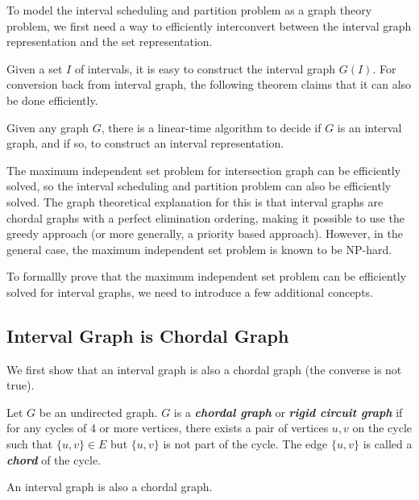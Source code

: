 To model the interval scheduling and partition problem as a graph theory problem, we first need a way to efficiently interconvert between the interval graph representation and the set representation.

Given a set $I$ of intervals, it is easy to construct the interval graph $G(I)$. For conversion back from interval graph, the following theorem claims that it can also be done efficiently.

\begin{theorem}
    Given any graph $G$, there is a linear-time algorithm to decide if $G$ is an interval graph, and if so, to construct an interval representation.
\end{theorem}

The maximum independent set problem for intersection graph can be efficiently solved, so the interval scheduling and partition problem can also be efficiently solved. The graph theoretical explanation for this is that interval graphs are chordal graphs with a perfect elimination ordering, making it possible to use the greedy approach (or more generally, a priority based approach). However, in the general case, the maximum independent set problem is known to be NP-hard.

To formallly prove that the maximum independent set problem can be efficiently solved for interval graphs, we need to introduce a few additional concepts.

\subsection{Interval Graph is Chordal Graph}

We first show that an interval graph is also a chordal graph (the converse is not true).

\begin{definition}   
    Let $G$ be an undirected graph. $G$ is a \textit{\textbf{chordal graph}} or \textit{\textbf{rigid circuit graph}} if for any cycles of 4 or more vertices, there exists a pair of vertices $u,v$ on the cycle such that $\{u,v\} \in E$ but $\{u,v\}$ is not part of the cycle. The edge $\{u,v\}$ is called a \textit{\textbf{chord}} of the cycle.
\end{definition}

\vspace{\parskip}

\begin{theorem}
    An interval graph is also a chordal graph.
\end{theorem}

